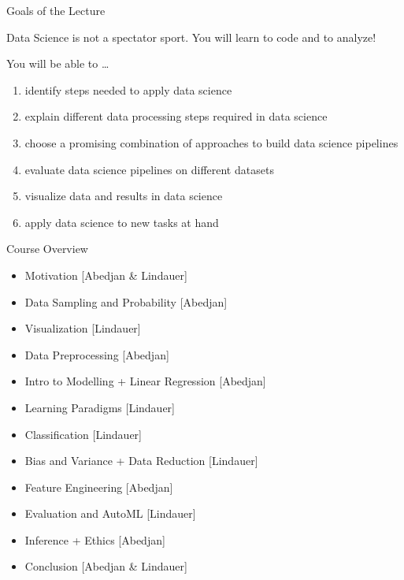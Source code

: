 \documentclass[aspectratio=169]{../latex_main/tntbeamer}  %
\begin{document}
\begin{frame}[c]{Goals of the Lecture}

Data Science is not a spectator sport.
You will learn to code and to analyze!

You will be able to \ldots
\begin{enumerate}
  \item \alert{identify} steps needed to apply data science
  \pause
  \item \alert{explain} different data processing steps required in data science
  \pause
  \item \alert{choose} a promising combination of approaches to build data science pipelines
  \pause
  \item \alert{evaluate} data science pipelines on different datasets
  \pause
  \item \alert{visualize} data and results in data science
  \pause
  \item \alert{apply} data science to new tasks at hand
\end{enumerate}

\end{frame}
\begin{frame}[c]{Course Overview}

\begin{itemize} 
    \item Motivation [Abedjan \& Lindauer] 
	\item Data Sampling and Probability [Abedjan]
        \item Visualization [Lindauer]	
        \item Data Preprocessing [Abedjan] 
	\pause
	\item Intro to Modelling + Linear Regression [Abedjan]  
	\item Learning Paradigms [Lindauer] 
	\item Classification  [Lindauer]
        \pause
	\item Bias and Variance + Data Reduction [Lindauer]  
        \item Feature Engineering [Abedjan] 
        \item Evaluation and AutoML [Lindauer]
	\pause
	\item Inference + Ethics [Abedjan] 
	\pause
	\item Conclusion [Abedjan \& Lindauer]
\end{itemize}


\end{frame}
\end{document}
